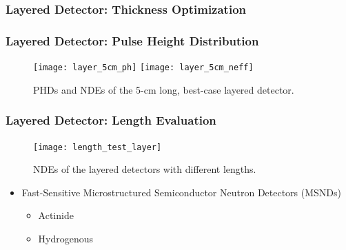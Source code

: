 \documentclass[fleqn]{beamer}
\begin{document}
\begin{frame}
 \frametitle{Layered Detector: Thickness Optimization}
 \begin{table}[h!tb]
\caption{The NDEs (\%) of 5-cm long, layered detectors with different layer thicknesses. The LLDs were set to achieve S/N ratio of 100 considering scintillation and Cherenkov noises.} 
\label{layer_opt}
\end{table}
\end{frame}

\begin{frame}
 \frametitle{Layered Detector: Pulse Height Distribution}
 \begin{figure}
       \texttt{[image: layer\_5cm\_ph]}
       \texttt{[image: layer\_5cm\_neff]}
       \caption{PHDs and NDEs of the 5-cm long, best-case layered detector.}
      \end{figure}
\end{frame}

\begin{frame}
 \frametitle{Layered Detector: Length Evaluation}
 \begin{figure}
  \texttt{[image: length\_test\_layer]}
  \caption{NDEs of the layered detectors with different lengths.}
 \end{figure}
\end{frame}

\begin{frame}
\centering
\begin{itemize}
 \item Fast-Sensitive Microstructured Semiconductor Neutron Detectors (MSNDs)
 \begin{itemize}
  \item Actinide
  \item Hydrogenous
 \end{itemize}
\end{itemize}
\end{frame}
\end{document}
